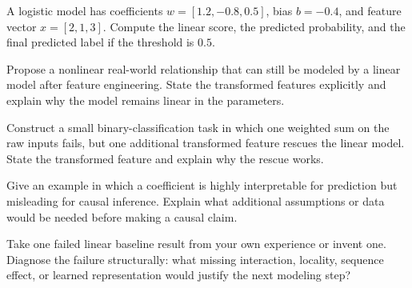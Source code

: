 \begin{challengeexercises}
\item A logistic model has coefficients $w = [1.2, -0.8, 0.5]$, bias $b=-0.4$, and feature vector $x=[2,1,3]$. Compute the linear score, the predicted probability, and the final predicted label if the threshold is $0.5$.
\item Propose a nonlinear real-world relationship that can still be modeled by a linear model after feature engineering. State the transformed features explicitly and explain why the model remains linear in the parameters.
\item Construct a small binary-classification task in which one weighted sum on the raw inputs fails, but one additional transformed feature rescues the linear model. State the transformed feature and explain why the rescue works.
\item Give an example in which a coefficient is highly interpretable for prediction but misleading for causal inference. Explain what additional assumptions or data would be needed before making a causal claim.
\item Take one failed linear baseline result from your own experience or invent one. Diagnose the failure structurally: what missing interaction, locality, sequence effect, or learned representation would justify the next modeling step?
\end{challengeexercises}
